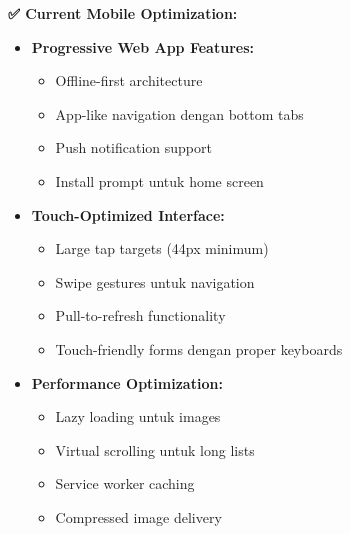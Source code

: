 \documentclass[12pt,a4paper]{article}
\begin{document}
\begin{implemented}
\textbf{✅ Current Mobile Optimization:}
\begin{itemize}
    \item \textbf{Progressive Web App Features:}
    \begin{itemize}
        \item Offline-first architecture
        \item App-like navigation dengan bottom tabs
        \item Push notification support
        \item Install prompt untuk home screen
    \end{itemize}
    \item \textbf{Touch-Optimized Interface:}
    \begin{itemize}
        \item Large tap targets (44px minimum)
        \item Swipe gestures untuk navigation
        \item Pull-to-refresh functionality
        \item Touch-friendly forms dengan proper keyboards
    \end{itemize}
    \item \textbf{Performance Optimization:}
    \begin{itemize}
        \item Lazy loading untuk images
        \item Virtual scrolling untuk long lists
        \item Service worker caching
        \item Compressed image delivery
    \end{itemize}
\end{itemize}
\end{implemented}
\end{document}
